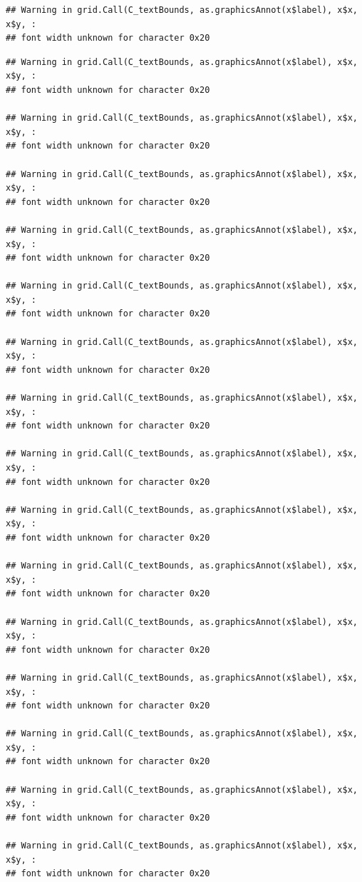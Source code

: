\documentclass[]{article}
\theoremstyle{definition}
\theoremstyle{definition}
\theoremstyle{definition}
\theoremstyle{remark}
\begin{document}
\begin{verbatim}
## Warning in grid.Call(C_textBounds, as.graphicsAnnot(x$label), x$x, x$y, :
## font width unknown for character 0x20
\end{verbatim}

\begin{verbatim}
## Warning in grid.Call(C_textBounds, as.graphicsAnnot(x$label), x$x, x$y, :
## font width unknown for character 0x20

## Warning in grid.Call(C_textBounds, as.graphicsAnnot(x$label), x$x, x$y, :
## font width unknown for character 0x20

## Warning in grid.Call(C_textBounds, as.graphicsAnnot(x$label), x$x, x$y, :
## font width unknown for character 0x20

## Warning in grid.Call(C_textBounds, as.graphicsAnnot(x$label), x$x, x$y, :
## font width unknown for character 0x20

## Warning in grid.Call(C_textBounds, as.graphicsAnnot(x$label), x$x, x$y, :
## font width unknown for character 0x20

## Warning in grid.Call(C_textBounds, as.graphicsAnnot(x$label), x$x, x$y, :
## font width unknown for character 0x20

## Warning in grid.Call(C_textBounds, as.graphicsAnnot(x$label), x$x, x$y, :
## font width unknown for character 0x20

## Warning in grid.Call(C_textBounds, as.graphicsAnnot(x$label), x$x, x$y, :
## font width unknown for character 0x20

## Warning in grid.Call(C_textBounds, as.graphicsAnnot(x$label), x$x, x$y, :
## font width unknown for character 0x20

## Warning in grid.Call(C_textBounds, as.graphicsAnnot(x$label), x$x, x$y, :
## font width unknown for character 0x20

## Warning in grid.Call(C_textBounds, as.graphicsAnnot(x$label), x$x, x$y, :
## font width unknown for character 0x20

## Warning in grid.Call(C_textBounds, as.graphicsAnnot(x$label), x$x, x$y, :
## font width unknown for character 0x20

## Warning in grid.Call(C_textBounds, as.graphicsAnnot(x$label), x$x, x$y, :
## font width unknown for character 0x20

## Warning in grid.Call(C_textBounds, as.graphicsAnnot(x$label), x$x, x$y, :
## font width unknown for character 0x20

## Warning in grid.Call(C_textBounds, as.graphicsAnnot(x$label), x$x, x$y, :
## font width unknown for character 0x20


\end{verbatim}
\end{document}
